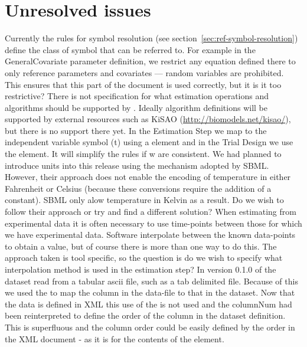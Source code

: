 \chapter{Unresolved issues}
\label{chap:unresolved}

\begin{issues}
 Currently the rules for symbol resolution (see section~\ref{sec:ref-symbol-resolution}) define the class of symbol that can be referred to. For example in the GeneralCovariate parameter definition, we restrict any equation defined there to only reference parameters and covariates --- random variables are prohibited. This ensures that this part of the \pharmml document is used correctly, but it is it too restrictive?
 There is not specification for what estimation operations and algorithms should be supported by \pharmml. Ideally algorithm definitions will be supported by external resources such as KiSAO (\url{http://biomodels.net/kisao/}), but there is no support there yet.
 In the Estimation Step we map to the independent variable symbol (t) using a  element and in the Trial Design we use the  element. It will simplify the rules if w are consistent.
 We had planned to introduce units into this release using the mechanism adopted by SBML. However, their approach does not enable the encoding of temperature in either Fahrenheit or Celsius (because these conversions require the addition of a constant). SBML only alow temperature in Kelvin as a result. Do we wish to follow their approach or try and find a different solution?
 When estimating from experimental data it is often necessary to use time-points between those for which we have experimental data. Software interpolate between the known data-points to obtain a value, but of course there is more than one way to do this. The approach taken is tool specific, so the question is do we wish to specify what interpolation method is used in the estimation step?
 In version 0.1.0 of \pharmml the dataset read from a tabular ascii file, such as a tab delimited file. Because of this we used the  to map the column in the data-file to that in the dataset. Now that the data is defined in XML this use of the  is not used and the columnNum had been reinterpreted to define the order of the column in the dataset definition. This is superfluous and the column order could be easily defined by the order in the XML document - as it is for the contents of the  element.
\end{issues}
